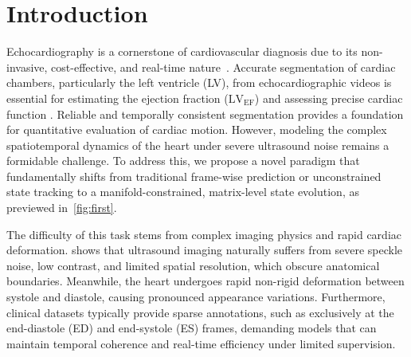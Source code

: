\section{Introduction}

\noindent
Echocardiography is a cornerstone of cardiovascular diagnosis due to its non-invasive, cost-effective, and real-time nature~\cite{10.3389/fcvm.2020.00025}.
Accurate segmentation of cardiac chambers, particularly the left ventricle (LV), from echocardiographic videos is essential for estimating the ejection fraction ($\text{LV}_{\text{EF}}$) and assessing precise cardiac function \cite{el2022semi,amer2021resdunet}.
Reliable and temporally consistent segmentation provides a foundation for quantitative evaluation of cardiac motion.
However, modeling the complex spatiotemporal dynamics of the heart under severe ultrasound noise remains a formidable challenge.
To address this, we propose a novel paradigm that fundamentally shifts from traditional frame-wise prediction or unconstrained state tracking to a manifold-constrained, matrix-level state evolution, as previewed in~\cref{fig:first}.

The difficulty of this task stems from complex imaging physics and rapid cardiac deformation.  shows that ultrasound imaging naturally suffers from severe speckle noise, low contrast, and limited spatial resolution, which obscure anatomical boundaries.
Meanwhile, the heart undergoes rapid non-rigid deformation between systole and diastole, causing pronounced appearance variations.
Furthermore, clinical datasets typically provide sparse annotations, such as exclusively at the end-diastole (ED) and end-systole (ES) frames, demanding models that can maintain temporal coherence and real-time efficiency under limited supervision.

